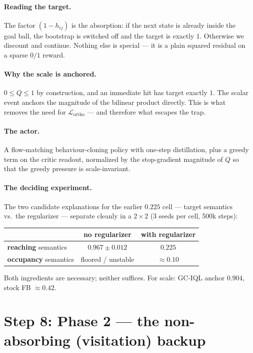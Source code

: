 \documentclass[11pt]{article}
\begin{document}
\paragraph{Reading the target.} The factor $(1-h_{ij})$ is the absorption: if the
next state is already inside the goal ball, the bootstrap is switched off and the
target is exactly $1$. Otherwise we discount and continue. Nothing else is
special --- it is a plain squared residual on a sparse $0/1$ reward.

\paragraph{Why the scale is anchored.} $0 \le Q \le 1$ by construction, and an
immediate hit has target exactly $1$. The scalar event anchors the magnitude of
the bilinear product directly. This is what removes the need for
$\mathcal{L}_{\mathrm{ortho}}$ --- and therefore what escapes the trap.

\paragraph{The actor.} A flow-matching behaviour-cloning policy with one-step
distillation, plus a greedy term on the critic readout, normalized by the
stop-gradient magnitude of $Q$ so that the greedy pressure is scale-invariant.

\paragraph{The deciding experiment.} The two candidate explanations for the
earlier $0.225$ cell --- target semantics vs.\ the regularizer --- separate
cleanly in a $2\times2$ (3 seeds per cell, 500k steps):
\begin{center}
\begin{tabular}{lcc}
\toprule
 & no regularizer & with regularizer \\
\midrule
\textbf{reaching} semantics  & $\mathbf{0.967 \pm 0.012}$ & $0.225$ \\
\textbf{occupancy} semantics & floored / unstable & $\approx 0.10$ \\
\bottomrule
\end{tabular}
\end{center}
Both ingredients are necessary; neither suffices. For scale: GC-IQL anchor
$0.904$, stock FB $\approx 0.42$.

\section{Step 8: Phase 2 --- the non-absorbing (visitation) backup}
\label{sec:phase2}
\end{document}
